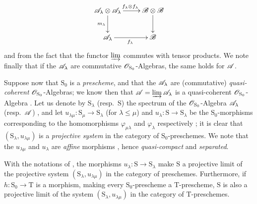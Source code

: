 \begin{env}[8.2.1]
\[
\xymatrix{
  \sh{A}_\lambda\otimes\sh{A}_\lambda \ar[r]^{f_\lambda\otimes f_\lambda} \ar[d]_{m_\lambda} & \sh{B}\otimes\sh{B} \ar[d] \\
  \sh{A}_\lambda \ar[r]_{f_\lambda} & \sh{B}
}
\]
and from the fact that the functor $\varinjlim$ commutes with tensor products.
We note finally that if the $\mathscr{A}_\lambda$ are commutative $\mathscr{O}_{\mathrm{S}_0}$-Algebras, the same holds for $\mathscr{A}$.
\end{env}

\begin{env}[8.2.2]
\label{IV.8.2.2}
Suppose now that $\mathrm{S}_0$ is a \emph{prescheme}, and that the $\mathscr{A}_\lambda$ are (commutative) \emph{quasi-coherent} $\mathscr{O}_{\mathrm{S}_0}$-Algebras; we know then that $\mathscr{A}=\varinjlim\mathscr{A}_\lambda$ is a quasi-coherent $\mathscr{O}_{\mathrm{S}_0}$-Algebra .
Let us denote by $\mathrm{S}_\lambda$ (resp.\ $\mathrm{S}$) the spectrum of the $\mathscr{O}_{\mathrm{S}_0}$-Algebra $\mathscr{A}_\lambda$ (resp.\ $\mathscr{A}$) , and let $u_{\lambda\mu}:\mathrm{S}_\mu\to\mathrm{S}_\lambda$ (for $\lambda\leqslant\mu$) and $u_\lambda:\mathrm{S}\to\mathrm{S}_\lambda$ be the $\mathrm{S}_0$-morphisms corresponding to the homomorphisms $\varphi_{\mu\lambda}$ and $\varphi_\lambda$ respectively ; it is clear that $(\mathrm{S}_\lambda,u_{\lambda\mu})$ is a \emph{projective system} in the category of $\mathrm{S}_0$-preschemes.
We note that the $u_{\lambda\mu}$ and $u_\lambda$ are \emph{affine} morphisms , hence \emph{quasi-compact} and \emph{separated}.
\end{env}

\begin{proposition}[8.2.3]
\label{IV.8.2.3}
With the notations of , the morphisms $u_\lambda:\mathrm{S}\to\mathrm{S}_\lambda$ make $\mathrm{S}$ a projective limit of the projective system $(\mathrm{S}_\lambda,u_{\lambda\mu})$ in the category of preschemes.
Furthermore, if $h:\mathrm{S}_0\to\mathrm{T}$ is a morphism, making every $\mathrm{S}_0$-prescheme a $\mathrm{T}$-prescheme, $\mathrm{S}$ is also a projective limit of the system $(\mathrm{S}_\lambda,u_{\lambda\mu})$ in the category of $\mathrm{T}$-preschemes.
\end{proposition}

